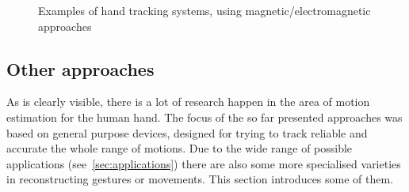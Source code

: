 \begin{figure}[h]
	\hfill
	
	\caption[Magnetic hand tracking systems.]
	{Examples of hand tracking systems, using magnetic/electromagnetic approaches}
	\label{fig:examplesMagnetic}
\end{figure}

\FloatBarrier
\subsection{Other approaches} \label{subsec:approaches:other}
As is clearly visible, there is a lot of research happen in the area of motion estimation for the human hand. The focus of the so far presented approaches was based on general purpose devices, designed for trying to track reliable and accurate the whole range of motions. Due to the wide range of possible applications (see~\ref{sec:applications}) there are also some more specialised varieties in reconstructing gestures or movements. This section introduces some of them.

